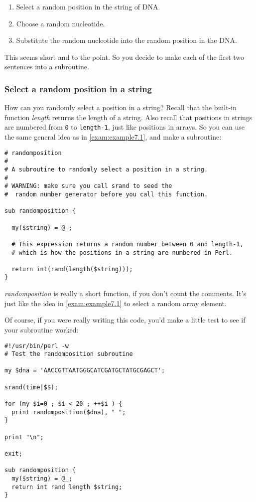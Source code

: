 \begin{enumerate}
  \item Select a random position in the string of DNA.
  \item Choose a random nucleotide.
  \item Substitute the random nucleotide into the random position in the DNA.
\end{enumerate}

This seems short and to the point. So you decide to make each of the first two sentences into a subroutine. 
\subsubsection{Select a random position in a string}
How can you randomly select a position in a string? Recall that the built-in function \textit{length} returns the length of a string. Also recall that positions in strings are numbered from \verb|0| to \verb|length-1|, just like positions in arrays. So you can use the same general idea as in \autoref{exam:example7.1}, and make a subroutine: 

\begin{lstlisting}
# randomposition
#
# A subroutine to randomly select a position in a string.
#
# WARNING: make sure you call srand to seed the
#  random number generator before you call this function.

sub randomposition {

  my($string) = @_;

  # This expression returns a random number between 0 and length-1,
  # which is how the positions in a string are numbered in Perl.

  return int(rand(length($string)));
}
\end{lstlisting}

\textit{randomposition} is really a short function, if you don't count the comments. It's just like the idea in \autoref{exam:example7.1} to select a random array element.

Of course, if you were really writing this code, you'd make a little test to see if your subroutine worked:

\begin{lstlisting}
#!/usr/bin/perl -w
# Test the randomposition subroutine

my $dna = 'AACCGTTAATGGGCATCGATGCTATGCGAGCT';

srand(time|$$);

for (my $i=0 ; $i < 20 ; ++$i ) {
  print randomposition($dna), " ";
}

print "\n";

exit;

sub randomposition {
  my($string) = @_;
  return int rand length $string;
}
\end{lstlisting}

